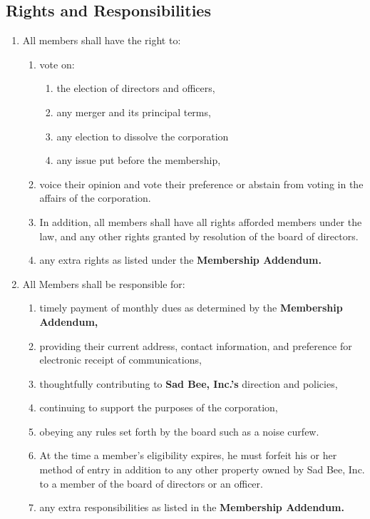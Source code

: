 \documentclass{article}
\begin{document}
\subsection{Rights and Responsibilities}
\begin{enumerate}
    \item All members shall have the right to:
    \begin{enumerate}
        \item vote on:
        \begin{enumerate}
            \item the election of directors and officers,
            \item any merger and its principal terms,
            \item any election to dissolve the corporation
            \item any issue put before the membership,
        \end{enumerate}
        \item voice their opinion and vote their preference or abstain from
        voting in the affairs of the corporation.
        \item In addition, all members shall have all rights afforded members
        under the law, and any other rights granted by resolution of the board
        of directors.
        \item any extra rights as listed under the \textbf{Membership Addendum.}
    \end{enumerate}
    \item All Members shall be responsible for:
    \begin{enumerate}
        \item timely payment of monthly dues as determined by the \textbf{Membership Addendum,}
        \item providing their current address, contact information, and
        preference for electronic receipt of communications,
        \item thoughtfully contributing to \textbf{Sad Bee, Inc.'s} direction and
    policies,
        \item continuing to support the purposes of the corporation,
        \item obeying any rules set forth by the board such as a noise curfew.
        \item At the time a member’s eligibility expires, he must forfeit his or
    her method of entry in addition to any other property owned by Sad Bee, Inc.
    to a member of the board of directors or an officer.
        \item any extra responsibilities as listed in the \textbf{Membership Addendum.}
    \end{enumerate}
\end{enumerate}
\end{document}
